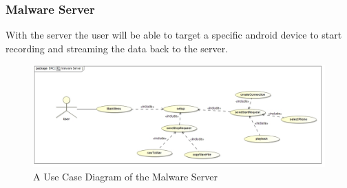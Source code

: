 \documentclass{article}
\begin{document}
	\subsubsection{Malware Server}
	With the server the user will be able to target a specific android device to start recording and streaming the data back to the server.
		\begin{figure}[H]
 			 \centering
			  \includegraphics[width=12cm]{MalwareServerUseCase}
		 	 \caption{A Use Case Diagram of the Malware Server}
		\end{figure}
\end{document}
